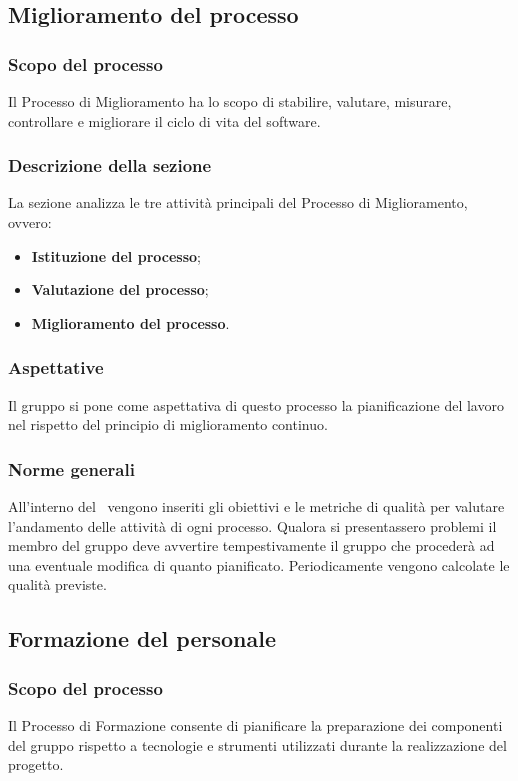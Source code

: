 \subsection{Miglioramento del processo}
\subsubsection{Scopo del processo}
Il Processo di Miglioramento ha lo scopo di stabilire, valutare, misurare, controllare e migliorare il ciclo di vita del software.
\subsubsection{Descrizione della sezione}
La sezione analizza le tre attività principali del Processo di Miglioramento, ovvero:
\begin{itemize}
	\item \textbf{Istituzione del processo};	
	\item \textbf{Valutazione del processo};
	\item \textbf{Miglioramento del processo}.
\end{itemize}
\subsubsection{Aspettative}
Il gruppo si pone come aspettativa di questo processo la pianificazione del lavoro nel rispetto del principio di miglioramento continuo.
\subsubsection{Norme generali}\label{PO_NormeGenerali}
All'interno del \PdQv{}\ vengono inseriti gli obiettivi e le metriche di qualità per valutare l'andamento delle attività di ogni processo. Qualora si presentassero problemi il membro del gruppo deve avvertire tempestivamente il gruppo che procederà ad una eventuale modifica di quanto pianificato. Periodicamente vengono calcolate le qualità previste.

\subsection{Formazione del personale}
\subsubsection{Scopo del processo}
Il Processo di Formazione consente di pianificare la preparazione dei componenti del gruppo rispetto a tecnologie e strumenti utilizzati durante la realizzazione del progetto.
